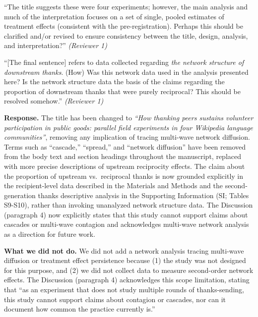 \documentclass[12pt]{article}
\newenvironment{reviewquote}{%
  \def\FrameCommand{{\color{quotebarcolor}\vrule width 2pt}\colorbox{quotebg}}%
  \MakeFramed{\advance\hsize-\width \FrameRestore}%
  \small
}{%
  \endMakeFramed
}
\begin{document}
\begin{reviewquote}
``The title suggests these were four experiments; however, the main analysis and much of the interpretation focuses on a set of single, pooled estimates of treatment effects (consistent with the pre-registration). Perhaps this should be clarified and/or revised to ensure consistency between the title, design, analysis, and interpretation?'' \textit{(Reviewer 1)}
\end{reviewquote}

\begin{reviewquote}
``[The final sentence] refers to data collected regarding \textit{the network structure of downstream thanks}. (How) Was this network data used in the analysis presented here? Is the network structure data the basis of the claims regarding the proportion of downstream thanks that were purely reciprocal? This should be resolved somehow.'' \textit{(Reviewer 1)}
\end{reviewquote}

\textbf{Response.} The title has been changed to \textit{``How thanking peers sustains volunteer participation in public goods: parallel field experiments in four Wikipedia language communities''}, removing any implication of tracing multi-wave network diffusion. Terms such as ``cascade,'' ``spread,'' and ``network diffusion'' have been removed from the body text and section headings throughout the manuscript, replaced with more precise descriptions of upstream reciprocity effects. The claim about the proportion of upstream vs.\ reciprocal thanks is now grounded explicitly in the recipient-level data described in the Materials and Methods and the second-generation thanks descriptive analysis in the Supporting Information (SI; Tables S9-S10), rather than invoking unanalyzed network structure data. The Discussion (paragraph 4) now explicitly states that this study cannot support claims about cascades or multi-wave contagion and acknowledges multi-wave network analysis as a direction for future work.

\textbf{What we did not do.} We did not add a network analysis tracing multi-wave diffusion or treatment effect persistence because (1) the study was not designed for this purpose, and (2) we did not collect data to measure second-order network effects. The Discussion (paragraph 4) acknowledges this scope limitation, stating that ``as an experiment that does not study multiple rounds of thanks-sending, this study cannot support claims about contagion or cascades, nor can it document how common the practice currently is.''
\end{document}
